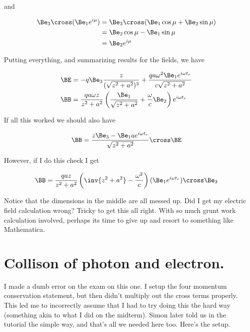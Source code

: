 and

\begin{align*}
\Be_3 \cross (\Be_1 e^{i \mu})
&=
\Be_3 \cross (\Be_1 \cos\mu + \Be_2 \sin\mu) \\
&=
\Be_2 \cos\mu - \Be_1 \sin\mu \\
&=
\Be_2 e^{i \mu}
\end{align*}

Putting everything, and summarizing results for the fields, we have

\begin{align}\label{eqn:relativisticElectrodynamicsExamReflection:250}
\BE &= 
-q \Be_3 \frac{z}{(\sqrt{z^2 + a^2})^3}
+
\frac{q a \omega^2 \Be_1 e^{i \omega t_r} }{c \sqrt{z^2 + a^2}} \\
\BB 
&= \frac{q a \omega z}{ z^2 + a^2} \left( \frac{\Be_1}{\sqrt{z^2 + a^2}} + \frac{\omega}{c} \Be_2 \right) e^{i \omega t_r}
\end{align}

If all this worked we should also have

\begin{equation}\label{eqn:relativisticElectrodynamicsExamReflection:270}
\BB = \frac{z \Be_3 - \Be_1 a e^{i \omega t_r}}{\sqrt{z^2 + a^2}} \cross \BE
\end{equation}

However, if I do this check I get

\begin{equation}\label{eqn:relativisticElectrodynamicsExamReflection:290}
\BB = \frac{q a z}{z^2 + a^2} \left( \inv{z^2 + a^2} - \frac{\omega^2 }{c} \right) (\Be_1 e^{i \omega t_r}) \cross \Be_3
\end{equation}

Notice that the dimensions in the middle are all messed up.  Did I get my electric field calculation wrong?  Tricky to get this all right.  With so much grunt work calculation involved, perhaps its time to give up and resort to something like Mathematica.

\section{Collison of photon and electron.}

I made a dumb error on the exam on this one.  I setup the four momentum conservation statement, but then didn't multiply out the cross terms properly.  This led me to incorrectly assume that I had to try doing this the hard way (something akin to what I did on the midterm).  Simon later told us in the tutorial the simple way, and that's all we needed here too.  Here's the setup.

